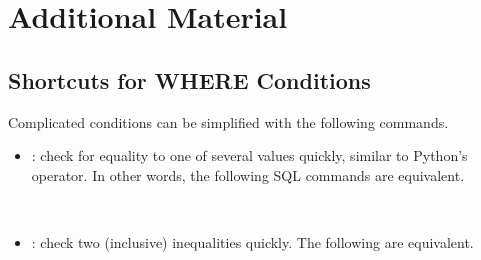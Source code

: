 \newpage

\section*{Additional Material} %

\subsection*{Shortcuts for WHERE Conditions}

Complicated  conditions can be simplified with the following commands.
\begin{itemize}
    \item {}: check for equality to one of several values quickly, similar to Python's  operator.
    In other words, the following SQL commands are equivalent.
    \begin{center}
        \\
    \end{center}

    \item {}: check two (inclusive) inequalities quickly.
    The following are equivalent.
    \begin{center}
        \\
    \end{center}
\end{itemize}

